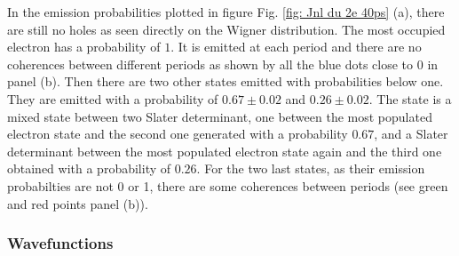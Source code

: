 In the emission probabilities plotted in figure Fig. \ref{fig: Jnl du 2e 40ps} (a), there are still no holes as seen directly on the Wigner distribution.
The most occupied electron has a probability of $1$.
It is emitted at each period and there are no coherences between different periods as shown by all the blue dots close to 0 in panel (b).
Then there are two other states emitted with probabilities below one.
They are emitted with a probability of $0.67 \pm 0.02$ and $0.26 \pm 0.02$.
The state is a mixed state between two Slater determinant, one between the most populated electron state and the second one generated with a probability $0.67$, and a Slater determinant between the most populated electron state again and the third one obtained with a probability of $0.26$.
For the two last states, as their emission probabilties are not 0 or 1, there are some coherences between periods (see green and red points panel (b)).

\subsubsection*{Wavefunctions}

